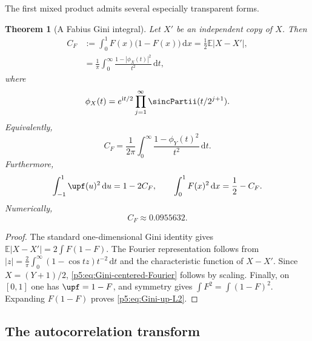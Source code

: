 \documentclass[11pt,oneside]{article}
\newtheorem{theorem}{Theorem}[section]
\theoremstyle{definition}
\theoremstyle{remark}
\newcommand{\E}{\mathbb E}
\newcommand{\dd}{\,\mathrm d}
\newcommand{\ii}{\mathrm i}
\newcommand{\1}{\mathbf 1}
\begin{document}
The first mixed product admits several especially transparent forms.

\begin{theorem}[A Fabius Gini integral]\label{p5:thm:Fabius-Gini}
Let $X'$ be an independent copy of $X$.  Then
\begin{align}
 C_F&:=\int_0^1F(x)\bigl(1-F(x)\bigr)\dd x
 =\frac12\E|X-X'|,\label{p5:eq:Gini-probability}\\
 &=\frac1\pi\int_0^\infty
 \frac{1-|\phi_X(t)|^2}{t^2}\dd t,\label{p5:eq:Gini-Fourier}
\end{align}
where
\begin{equation}\label{p5:eq:phi-X}
 \phi_X(t)=e^{\ii t/2}
 \prod_{j=1}^{\infty}\sincPartii(t/2^{j+1}).
\end{equation}
Equivalently,
\begin{equation}\label{p5:eq:Gini-centered-Fourier}
 C_F=\frac1{2\pi}\int_0^\infty
 \frac{1-\phi_Y(t)^2}{t^2}\dd t.
\end{equation}
Furthermore,
\begin{equation}\label{p5:eq:Gini-up-L2}
 \int_{-1}^{1}\upf(u)^2\dd u=1-2C_F,
 \qquad
 \int_0^1F(x)^2\dd x=\frac12-C_F.
\end{equation}
Numerically,
\begin{equation}\label{p5:eq:Gini-numerical}
 C_F\approx0.0955632.
\end{equation}
\end{theorem}

\begin{proof}
The standard one-dimensional Gini identity gives
$\E|X-X'|=2\int F(1-F)$.  The Fourier representation follows from
$|z|=\frac2\pi\int_0^\infty(1-\cos tz)t^{-2}\dd t$
and the characteristic function of $X-X'$.  Since $X=(Y+1)/2$, \eqref{p5:eq:Gini-centered-Fourier} follows by scaling.  Finally, on $[0,1]$ one has $\upf=1-F$, and symmetry gives
$\int F^2=\int(1-F)^2$.  Expanding $F(1-F)$ proves \eqref{p5:eq:Gini-up-L2}.
\end{proof}

\subsection{The autocorrelation transform}
\end{document}
